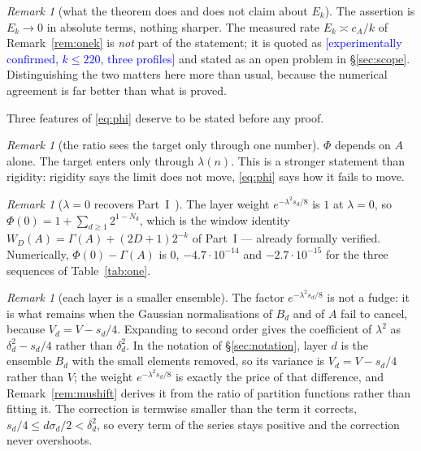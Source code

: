 \documentclass[11pt,a4paper]{article}
\theoremstyle{plain}
\theoremstyle{definition}
\theoremstyle{remark}
\newtheorem{remark}[theorem]{Remark}
\newcommand{\STATUS}[1]{\textcolor{blue}{\textsf{[#1]}}}
\begin{document}
\begin{remark}[what the theorem does and does not claim about $E_k$]\label{rem:whatEk}
The assertion is $E_k\to0$ in absolute terms, nothing sharper. The measured rate
$E_k\asymp c_A/k$ of Remark~\ref{rem:onek} is \emph{not} part of the statement; it is quoted as
\STATUS{experimentally confirmed, $k\le220$, three profiles} and stated as an open problem in
\S\ref{sec:scope}. Distinguishing the two matters here more than usual, because the numerical
agreement is far better than what is proved.
\end{remark}

Three features of \eqref{eq:phi} deserve to be stated before any proof.

\begin{remark}[the ratio sees the target only through one number]
$\Phi$ depends on $A$ alone. The target enters only through $\lambda(n)$. This is a stronger
statement than rigidity: rigidity says the limit does not move, \eqref{eq:phi} says how it
fails to move.
\end{remark}

\begin{remark}[$\lambda=0$ recovers Part~I~\cite{P1}]\label{rem:lam0}
The layer weight $e^{-\lambda^2s_d/8}$ is $1$ at $\lambda=0$, so
$\Phi(0)=1+\sum_{d\ge1}2^{1-N_d}$, which is the window identity
$W_D(A)=\Gamma(A)+(2D+1)2^{-k}$ of Part~I --- already formally verified.
Numerically, $\Phi(0)-\Gamma(A)$ is $0$, $-4.7\cdot10^{-14}$ and $-2.7\cdot10^{-15}$ for the
three sequences of Table~\ref{tab:one}.
\end{remark}

\begin{remark}[each layer is a smaller ensemble]\label{rem:weight}
The factor $e^{-\lambda^2 s_d/8}$ is not a fudge: it is what remains when the Gaussian
normalisations of $B_d$ and of $A$ fail to cancel, because $V_d=V-s_d/4$. Expanding to second
order gives the coefficient of $\lambda^2$ as $\delta_d^2-s_d/4$ rather than $\delta_d^2$.
In the notation of \S\ref{sec:notation}, layer $d$ is the ensemble $B_d$ with the small
elements removed, so its variance is $V_d=V-s_d/4$ rather than $V$; the weight
$e^{-\lambda^{2}s_d/8}$ is exactly the price of that difference, and
Remark~\ref{rem:mushift} derives it from the ratio of partition functions rather than
fitting it. The correction is termwise smaller than the term it corrects,
$s_d/4\le d\sigma_d/2<\delta_d^{2}$, so every term of the series stays positive and the
correction never overshoots.
\end{remark}
\end{document}
